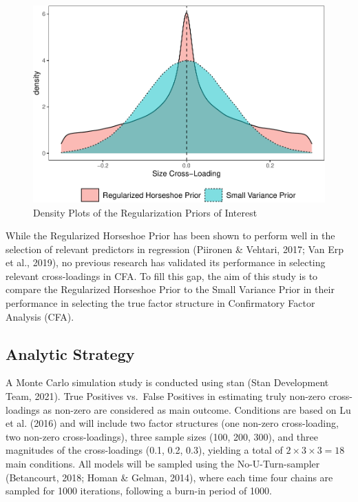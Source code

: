 \documentclass[
  english,
  man]{apa6}
\begin{document}
\begin{figure}
\centering
\includegraphics{JMBKoch_Proposal_files/figure-latex/unnamed-chunk-1-1.pdf}
\caption{\label{fig:unnamed-chunk-1}Density Plots of the Regularization Priors of Interest}
\end{figure}

While the Regularized Horseshoe Prior has been shown to perform well in
the selection of relevant predictors in regression
(Piironen \& Vehtari, 2017; Van Erp et al., 2019), no previous research
has validated its performance in selecting relevant cross-loadings in
CFA. To fill this gap, the aim of this study is to compare the
Regularized Horseshoe Prior to the Small Variance Prior in their
performance in selecting the true factor structure in Confirmatory
Factor Analysis (CFA).

\hypertarget{analytic-strategy}{%
\subsection{Analytic Strategy}\label{analytic-strategy}}

A Monte Carlo simulation study is conducted using stan
(Stan Development Team, 2021). True Positives vs.~False Positives
in estimating truly non-zero cross-loadings as non-zero are considered
as main outcome. Conditions are based on Lu et al. (2016) and will
include two factor structures (one non-zero cross-loading, two
non-zero cross-loadings), three sample sizes (100, 200, 300), and three
magnitudes of the cross-loadings (0.1, 0.2, 0.3), yielding a total of
\(2 \times 3 \times 3 = 18\) main conditions. All models will be sampled
using the No-U-Turn-sampler (Betancourt, 2018; Homan \& Gelman, 2014), where each time four chains are sampled
for 1000 iterations, following a burn-in period of 1000.
\end{document}
